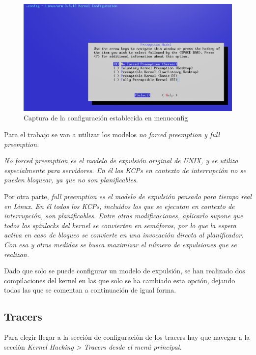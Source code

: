 \documentclass[../main.tex]{subfiles}
\begin{document}
\begin{figure}[htp]
    \centering
    \includegraphics[width=15cm]{imagenes/capturas/Linux-make-menuconfig-Preemtion-model.png}
    \caption{Captura de la configuración establecida en menuconfig}
\end{figure}

Para el trabajo se van a utilizar los modelos \it{no forced preemption} y \it{full preemption}.

\it{No forced preemption} es el modelo de expulsión original de UNIX, y se utiliza especialmente para servidores. En él los \it{KCP}s en contexto de interrupción no se pueden bloquear, ya que no son planificables.

Por otra parte, \it{full preemption} es el modelo de expulsión pensado para tiempo real en Linux. En él todos los \it{KCP}s, incluidos los que se ejecutan en contexto de interrupción, son planificables. Entre otras modificaciones, aplicarlo supone que todos los \it{spinlocks} del kernel se convierten en semáforos, por lo que la espera activa en caso de bloqueo se convierte en una invocación directa al planificador. Con esa y otras medidas se busca maximizar el número de expulsiones que se realizan.

Dado que solo se puede configurar un modelo de expulsión, se han realizado dos compilaciones del kernel en las que solo se ha cambiado esta opción, dejando todas las que se comentan a continuación de igual forma.

\subsection{Tracers}

Para elegir llegar a la sección de configuración de los tracers hay que navegar a la sección \it{Kernel Hacking > Tracers} desde el menú principal.
\end{document}
